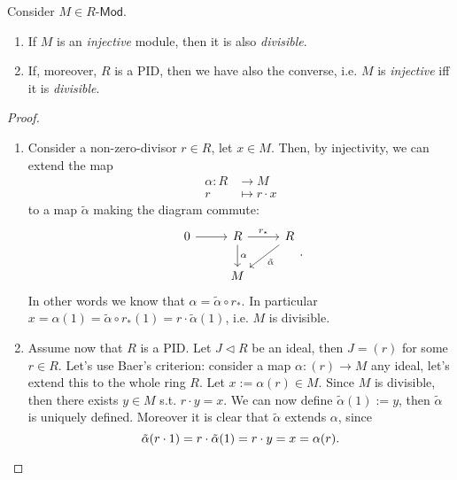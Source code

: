 \documentclass[../Main]{subfiles}
\begin{document}
\begin{prop}[]
	Consider $M \in R\text{-}\mathsf{Mod}$.
	\begin{enumerate}
		\item If $M$ is an {\em injective} module, then it is also {\em divisible}.
		\item If, moreover, $R$ is a PID, then we have also the converse,
			i.e. $M$ is {\em injective} iff it is {\em divisible}.
	\end{enumerate}
\end{prop}
\begin{proof}\leavevmode\vspace{-.2\baselineskip}
	\begin{enumerate}
		\item Consider a non-zero-divisor $r \in R$,
			let $x \in M$.
			Then, by injectivity, we can extend the map 
			\begin{align}
				\alpha\colon R &\longrightarrow M \\
				r &\longmapsto r \cdot x \nonumber
			\end{align} 
			to a map $\tilde{\alpha}$ making the diagram commute:
			\begin{equation}
			\begin{tikzcd}
				0 \arrow[r, "", rightarrow] &
				R \arrow[r, "r_*", rightarrow] \arrow[d, "\alpha", rightarrow] &
				R \arrow[dl, "\tilde{\alpha}", rightarrow] \\
				&
				M &
			\end{tikzcd}
			.\end{equation} 
			In other words we know that $\alpha = \tilde{\alpha} \circ r_*$.
			In particular $x = \alpha(1) = \tilde{\alpha} \circ r_* (1) = r \cdot \tilde{\alpha}(1)$,
			i.e. $M$ is divisible.

		\item Assume now that $R$ is a PID.
			Let $J \triangleleft R$ be an ideal, then $J = (r)$ for some $r \in R$.
			Let's use Baer's criterion:
			consider a map $\alpha\colon (r) \to M$ any ideal, let's extend this to the whole
			ring $R$.
			Let $x := \alpha(r) \in M$.
			Since $M$ is divisible, then there exists $y \in M$
			s.t. $r \cdot y = x$.
			We can now define $\tilde{\alpha}(1) := y$, then $\tilde{\alpha}$ is
			uniquely defined.
			Moreover it is clear that $\tilde{\alpha}$ extends $\alpha$, since
			\begin{equation*}
			\tilde{\alpha}(r \cdot 1) = r \cdot \tilde{\alpha}(1) = r \cdot y = x
			= \alpha(r).\qedhere
			\end{equation*} 
	\end{enumerate}
\end{proof}
\end{document}
